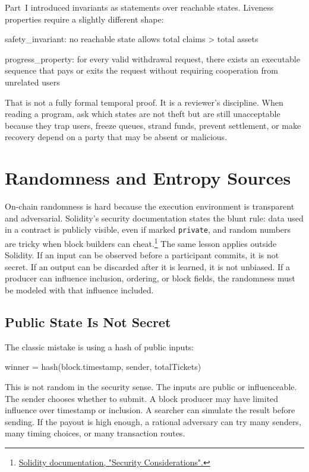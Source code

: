 Part~I introduced invariants as statements over reachable states. Liveness properties require a slightly different shape:

\begin{codeblock}
safety_invariant:
    no reachable state allows total claims > total assets

progress_property:
    for every valid withdrawal request,
    there exists an executable sequence that pays or exits the request
    without requiring cooperation from unrelated users
\end{codeblock}

That is not a fully formal temporal proof. It is a reviewer's discipline. When reading a program, ask which states are not theft but are still unacceptable because they trap users, freeze queues, strand funds, prevent settlement, or make recovery depend on a party that may be absent or malicious.

\section{Randomness and Entropy Sources}

On-chain randomness is hard because the execution environment is transparent and adversarial. Solidity's security documentation states the blunt rule: data used in a contract is publicly visible, even if marked \texttt{private}, and random numbers are tricky when block builders can cheat.\footnote{\href{https://docs.soliditylang.org/en/latest/security-considerations.html}{Solidity documentation, "Security Considerations".}} The same lesson applies outside Solidity. If an input can be observed before a participant commits, it is not secret. If an output can be discarded after it is learned, it is not unbiased. If a producer can influence inclusion, ordering, or block fields, the randomness must be modeled with that influence included.

\subsection{Public State Is Not Secret}

The classic mistake is using a hash of public inputs:

\begin{codeblock}
winner = hash(block.timestamp, sender, totalTickets) %
\end{codeblock}

This is not random in the security sense. The inputs are public or influenceable. The sender chooses whether to submit. A block producer may have limited influence over timestamp or inclusion. A searcher can simulate the result before sending. If the payout is high enough, a rational adversary can try many senders, many timing choices, or many transaction routes.

